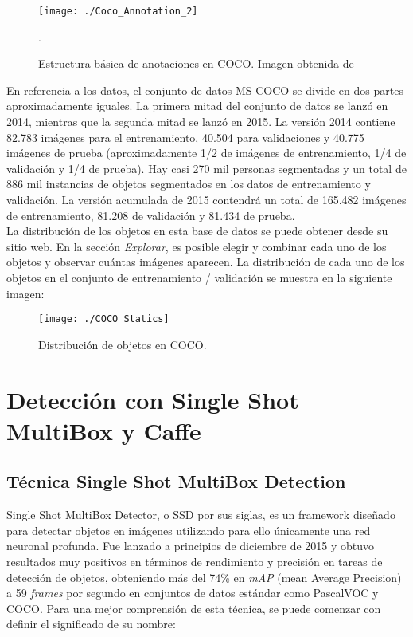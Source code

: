 \documentclass[a4paper, 12pt, spanish, chapterprefix, numbers=noenddot]{book}
\begin{document}
\begin{figure}[H]
\begin{center}
\texttt{[image: ./Coco\_Annotation\_2]}
\caption{Estructura básica de anotaciones en COCO. Imagen obtenida de \cite{CocoAnnotations}}.
\label{AnnotacionesCoco2}
\end{center}
\end{figure}

En referencia a los datos, el conjunto de datos MS COCO se divide en dos partes aproximadamente iguales. La primera mitad del conjunto de datos se lanzó en 2014, mientras que la segunda mitad se lanzó en 2015. La versión 2014 contiene 82.783 imágenes para el entrenamiento, 40.504 para validaciones y 40.775 imágenes de prueba (aproximadamente 1/2 de imágenes de entrenamiento, 1/4 de validación y 1/4 de prueba). Hay casi 270 mil personas segmentadas y un total de 886 mil instancias de objetos segmentados en los datos de entrenamiento y validación. La versión acumulada de 2015 contendrá un total de 165.482 imágenes de entrenamiento, 81.208 de validación y 81.434 de prueba.\\

La distribución de los objetos en esta base de datos se puede obtener desde su sitio web. En la sección \textit{Explorar}, es posible elegir y combinar cada uno de los objetos y observar cuántas imágenes aparecen. La distribución de cada uno de los objetos en el conjunto de entrenamiento / validación se muestra en la siguiente imagen:

\begin{figure}[H]
\begin{center}
\texttt{[image: ./COCO\_Statics]}
\caption{Distribución de objetos en COCO.}
\end{center}
\end{figure}

\chapter{Detección con Single Shot MultiBox y Caffe}

\section{Técnica Single Shot MultiBox Detection}

Single Shot MultiBox Detector\cite{SSD}, o SSD por sus siglas, es un framework diseñado para detectar objetos en imágenes utilizando para ello únicamente una red neuronal profunda. Fue lanzado a principios de diciembre de 2015 y obtuvo resultados muy positivos en términos de rendimiento y precisión en tareas de detección de objetos, obteniendo más del 74\% en \textit{mAP} (mean Average Precision) a 59 \textit{frames} por segundo en conjuntos de datos estándar como PascalVOC y COCO. Para una mejor comprensión de esta técnica, se puede comenzar con definir el significado de su nombre\cite{SSD_2}:
\end{document}
